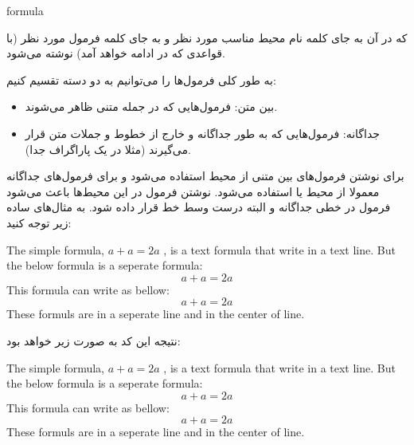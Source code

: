 \begin{latex}
\begin{environment}
formula
\end{environment}
\end{latex}

که در آن به جای کلمه  نام محیط مناسب مورد نظر و به جای کلمه
 فرمول مورد نظر (با قواعدی که در ادامه خواهد آمد) نوشته می‌شود.

به طور کلی فرمول‌ها را می‌توانیم به دو دسته تقسیم کنیم:

\begin{itemize}
  \item بین متن: فرمول‌هایی که در جمله متنی ظاهر می‌شوند.
  \item جداگانه: فرمول‌هایی که به طور جداگانه و خارج از خطوط و جملات متن قرار
  می‌گیرند (مثلا در یک پاراگراف جدا).
\end{itemize}

برای نوشتن فرمول‌های بین متنی از محیط  استفاده می‌شود و برای فرمول‌های
جداگانه معمولا از محیط  یا  استفاده می‌شود.
نوشتن فرمول در این محیط‌ها باعث می‌شود فرمول در خطی جداگانه و البته درست وسط
خط قرار داده شود. به مثال‌های ساده زیر توجه کنید:

\begin{latex}
The simple formula,
\begin{math}
a+a=2a
\end{math}
, is a text formula that write
in a text line. But the below formula is a seperate formula:
\begin{displaymath}
a+a=2a
\end{displaymath}
This formula can write as bellow:
\begin{equation*}
a+a=2a
\end{equation*}
These formuls are in a seperate line and in the center of line.
\end{latex}

نتیجه این کد \lr{\LaTeX} به صورت زیر خواهد بود:

\begin{latin}
The simple formula,
\begin{math}
a+a=2a
\end{math}
, is a text formula that write
in a text line. But the below formula is a seperate formula:
\begin{displaymath}
a+a=2a
\end{displaymath}
This formula can write as bellow:
\begin{equation*}
a+a=2a
\end{equation*}
These formuls are in a seperate line and in the center of line.
\end{latin}


